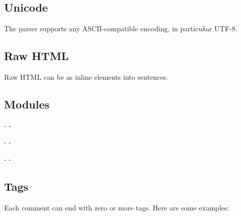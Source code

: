 \subsection{Unicode\label{unicode}}%
The parser supports any ASCII-compatible encoding, in particuλar UTF-8.

\subsection{Raw HTML\label{raw-html}}%
Raw HTML can be  as inline elements into sentences.

\subsection{Modules\label{modules}}%
\begin{description}\kern-\topsep
\makeatletter\advance\@topsepadd-\topsep\makeatother%
\end{description}%
\begin{description}\kern-\topsep
\makeatletter\advance\@topsepadd-\topsep\makeatother%
\item[\ocamlinlinecode{X}]{}\end{description}%
\begin{description}\kern-\topsep
\makeatletter\advance\@topsepadd-\topsep\makeatother%
\item[\ocamlinlinecode{X}]{}%
\item[\ocamlinlinecode{Y}]{}%
\item[\ocamlinlinecode{Z}]{}\end{description}%
\subsection{Tags\label{tags}}%
Each comment can end with zero or more tags. Here are some examples:

